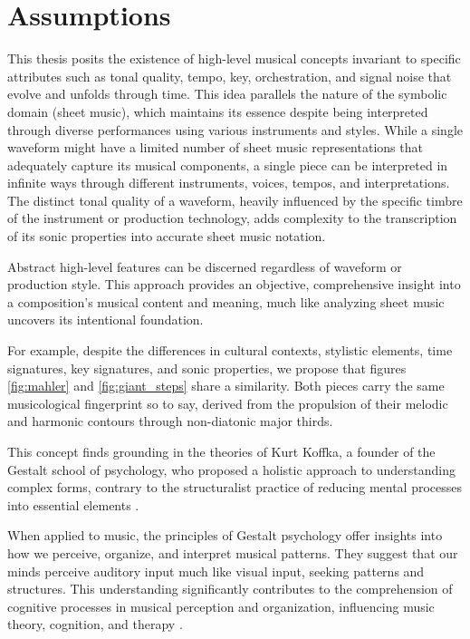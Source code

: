 \section{Assumptions}

This thesis posits the existence of high-level musical concepts invariant to specific attributes such as tonal quality, tempo, key, orchestration, and signal noise that evolve and unfolds through time. This idea parallels the nature of the symbolic domain (sheet music), which maintains its essence despite being interpreted through diverse performances using various instruments and styles. While a single waveform might have a limited number of sheet music representations that adequately capture its musical components, a single piece can be interpreted in infinite ways through different instruments, voices, tempos, and interpretations. The distinct tonal quality of a waveform, heavily influenced by the specific timbre of the instrument or production technology, adds complexity to the transcription of its sonic properties into accurate sheet music notation.

Abstract high-level features can be discerned regardless of waveform or production style. This approach provides an objective, comprehensive insight into a composition's musical content and meaning, much like analyzing sheet music uncovers its intentional foundation.

For example, despite the differences in cultural contexts, stylistic elements, time signatures, key signatures, and sonic properties, we propose that figures \ref{fig:mahler} and \ref{fig:giant_steps} share a similarity. Both pieces carry the same musicological fingerprint so to say, derived from the propulsion of their melodic and harmonic contours through non-diatonic major thirds.

This concept finds grounding in the theories of Kurt Koffka, a founder of the Gestalt school of psychology, who proposed a holistic approach to understanding complex forms, contrary to the structuralist practice of reducing mental processes into essential elements \cite{Koffka2013PrinciplesPsychology}.

When applied to music, the principles of Gestalt psychology offer insights into how we perceive, organize, and interpret musical patterns. They suggest that our minds perceive auditory input much like visual input, seeking patterns and structures. This understanding significantly contributes to the comprehension of cognitive processes in musical perception and organization, influencing music theory, cognition, and therapy \cite{Lerdahl1985AMusic}.

